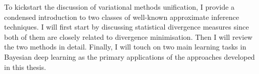 To kickstart the discussion of variational methods unification, I provide a condensed introduction to two classes of well-known approximate inference techniques. I will first start by discussing statistical divergence measures since both of them are closely related to divergence minimisation. Then I will review the two methods in detail. Finally, I will touch on two main learning tasks in Bayesian deep learning as the primary applications of the approaches developed in this thesis.